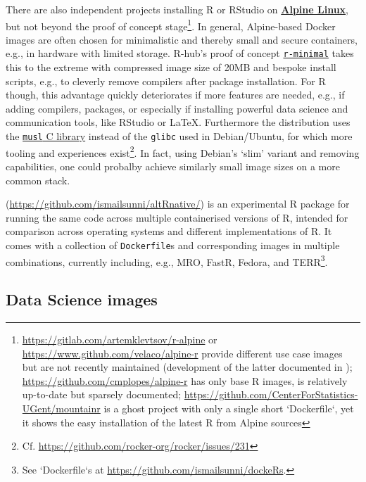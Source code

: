 There are also independent projects installing R or RStudio on
\href{https://www.alpinelinux.org/}{\textbf{Alpine Linux}}, but not
beyond the proof of concept
stage\footnote{\href{https://gitlab.com/artemklevtsov/r-alpine}{https://gitlab.com/artemklevtsov/r-alpine} or \href{https://www.github.com/velaco/alpine-r}{https://www.github.com/velaco/alpine-r} provide different use case images but are not recently maintained (development of the latter documented in \citet{ratesic_building_2018}); \href{https://github.com/cmplopes/alpine-r}{https://github.com/cmplopes/alpine-r} has only base R images, is relatively up-to-date but sparsely documented; \href{https://github.com/CenterForStatistics-UGent/mountainr}{https://github.com/CenterForStatistics-UGent/mountainr} is a ghost project with only a single short `Dockerfile`, yet it shows the easy installation of the latest R from Alpine sources}.
In general, Alpine-based Docker images are often chosen for minimalistic
and thereby small and secure containers, e.g., in hardware with limited
storage. R-hub's proof of concept
\href{https://github.com/r-hub/r-minimal}{\texttt{r-minimal}} takes this
to the extreme with compressed image size of 20MB and bespoke install
scripts, e.g., to cleverly remove compilers after package installation.
For R though, this advantage quickly deteriorates if more features are
needed, e.g., if adding compilers, packages, or especially if installing
powerful data science and communication tools, like RStudio or LaTeX.
Furthermore the distribution uses the
\href{https://www.musl-libc.org/}{\texttt{musl} C library} instead of
the \texttt{glibc} used in Debian/Ubuntu, for which more tooling and
experiences
exist\footnote{Cf. \href{https://github.com/rocker-org/rocker/issues/231}{https://github.com/rocker-org/rocker/issues/231}}.
In fact, using Debian's `slim' variant and removing capabilities, one
could probalby achieve similarly small image sizes on a more common
stack.

\textbf{}
(\url{https://github.com/ismailsunni/altRnative/}) is an experimental R
package for running the same code across multiple containerised versions
of R, intended for comparison across operating systems and different
implementations of R. It comes with a collection of \texttt{Dockerfile}s
and corresponding images in multiple combinations, currently including,
e.g., MRO, FastR, Fedora, and
TERR\footnote{See `Dockerfile`s at \href{https://github.com/ismailsunni/dockeRs}{https://github.com/ismailsunni/dockeRs}.}.

\hypertarget{data-science-images}{%
\subsection{Data Science images}\label{data-science-images}}

